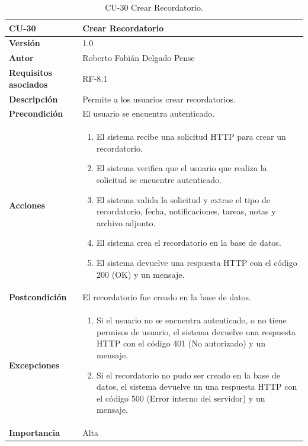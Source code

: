 \begin{table}[p]
	\centering
	\begin{tabularx}{\linewidth}{ p{} p{} }
		\toprule
		\textbf{CU-30}    & \textbf{Crear Recordatorio}\\
		\toprule
		\textbf{Versión}              & 1.0    \\
		\textbf{Autor}                & Roberto Fabián Delgado Pense \\
		\textbf{Requisitos asociados} & RF-8.1 \\ 
		\textbf{Descripción}          & Permite a los usuarios crear recordatorios. \\
		\textbf{Precondición}         & El usuario se encuentra autenticado. \\  
		\textbf{Acciones}             &
		\begin{enumerate}
			\def\labelenumi{\arabic{enumi}.}
			\tightlist
			\item El sistema recibe una solicitud HTTP para crear un recordatorio.
                \item El sistema verifica que el usuario que realiza la solicitud se encuentre autenticado.
                \item El sistema valida la solicitud y extrae el tipo de recordatorio, fecha, notificaciones, tareas, notas y archivo adjunto.
                \item El sistema crea el recordatorio en la base de datos.
                \item El sistema devuelve una respuesta HTTP con el código 200 (OK) y un mensaje.         
            \end{enumerate}\\
		\textbf{Postcondición}        & El recordatorio fue creado en la base de datos. \\
		\textbf{Excepciones}          & 
              \begin{enumerate}
			\def\labelenumi{\arabic{enumi}.}
			\tightlist
   			\item Si el usuario no se encuentra autenticado, o no tiene permisos de usuario, el sistema devuelve una respuesta HTTP con el código 401 (No autorizado) y un mensaje.
                \item   Si el recordatorio no pudo ser creado en la base de datos, el sistema devuelve un                           una respuesta HTTP con el código 500 (Error interno del servidor) y un mensaje. 
            \end{enumerate}\\
		\textbf{Importancia}          & Alta \\
		\bottomrule
	\end{tabularx}
	\caption{CU-30 Crear Recordatorio.}
\end{table}

